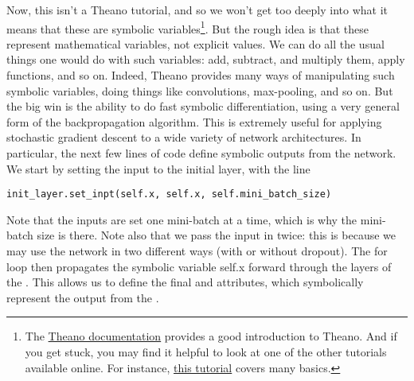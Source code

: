 \documentclass[a4paper,twoside,10pt]{book}
\begin{document}
Now, this isn't a Theano tutorial, and so we won't get too deeply into what it means that these are symbolic variables\footnote{The \href{http://deeplearning.net/software/theano/index.html}{Theano documentation} provides a good introduction to Theano. And if you get stuck, you may find it helpful to look at one of the other tutorials available online. For instance, \href{http://nbviewer.ipython.org/github/craffel/theano-tutorial/blob/master/Theano\%20Tutorial.ipynb}{this tutorial} covers many basics.}. But the rough idea is that these represent mathematical variables, not explicit values. We can do all the usual things one would do with such variables: add, subtract, and multiply them, apply functions, and so on. Indeed, Theano provides many ways of manipulating such symbolic variables, doing things like convolutions, max-pooling, and so on. But the big win is the ability to do fast symbolic differentiation, using a very general form of the backpropagation algorithm. This is extremely useful for applying stochastic gradient descent to a wide variety of network architectures. In particular, the next few lines of code define symbolic outputs from the network. We start by setting the input to the initial layer, with the line
\begin{lstlisting}
init_layer.set_inpt(self.x, self.x, self.mini_batch_size)
\end{lstlisting}
Note that the inputs are set one mini-batch at a time, which is why the mini-batch size is there. Note also that we pass the input  in twice: this is because we may use the network in two different ways (with or without dropout). The for loop then propagates the symbolic variable self.x forward through the layers of the . This allows us to define the final  and  attributes, which symbolically represent the output from the .
\end{document}
